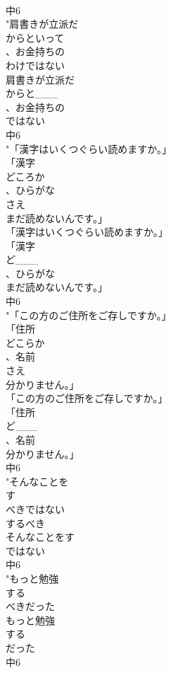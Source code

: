 \documentclass[8pt]{extreport}
\begin{document}
\begin{CJK}{UTF8}{min}
\\	中6
\\	"肩書きが立派だ
\\	からといって
\\	、お金持ちの
\\	わけではない
\\	肩書きが立派だ
\\	からと___
\\	、お金持ちの
\\	ではない
\\	中6
\\	"「漢字はいくつぐらい読めますか。」
\\	「漢字
\\	どころか
\\	、ひらがな
\\	さえ
\\	まだ読めないんです。」
\\	「漢字はいくつぐらい読めますか。」
\\	「漢字
\\	ど___
\\	、ひらがな
\\	まだ読めないんです。」
\\	中6
\\	"「この方のご住所をご存しですか。」
\\	「住所
\\	どこらか
\\	、名前
\\	さえ
\\	分かりません。」
\\	「この方のご住所をご存しですか。」
\\	「住所
\\	ど___
\\	、名前
\\	分かりません。」
\\	中6
\\	"そんなことを
\\	す
\\	べきではない
\\	するべき
\\	そんなことをす
\\	ではない
\\	中6
\\	"もっと勉強
\\	する
\\	べきだった
\\	もっと勉強
\\	する
\\	だった
\\	中6

\end{CJK}
\end{document}
